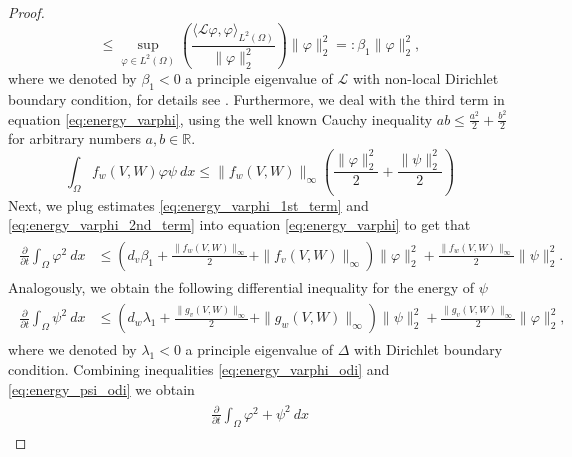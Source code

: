 \documentclass[11pt, a4paper]{article}
\theoremstyle{break}
\theoremstyle{break}
\theoremstyle{break}
\theoremstyle{break}
\theoremstyle{break}
\theoremstyle{break}
\theoremstyle{break}
\begin{document}
\begin{proof}
\begin{equation}
        \leq
        \sup_{\varphi \in L^2(\Omega)}\left( \frac{\langle \mathcal{L}\varphi, \varphi \rangle_{L^2(\Omega)}}{\|\varphi\|^2_2} \right) \|\varphi\|_2^2 =: \beta_1 \|\varphi\|_2^2,
    \end{equation}
    where we denoted by $\beta_1 < 0$ a principle eigenvalue of $\mathcal{L}$ with non-local Dirichlet boundary condition, for details see \cite{GarciaMelianRossi2009}. Furthermore, we deal with the third term in equation \eqref{eq:energy_varphi}, using the well known Cauchy inequality $ab \leq \frac{a^2}{2} + \frac{b^2}{2}$ for arbitrary numbers $a, b \in \mathbb{R}$.
    \begin{equation}
        \label{eq:energy_varphi_2nd_term}
        \int_\Omega f_w(V,W) \varphi \psi \:dx \leq \|f_w(V,W)\|_\infty \left( \frac{\|\varphi\|_2^2}{2} + \frac{\|\psi\|_2^2}{2} \right)
    \end{equation}
    Next, we plug estimates \eqref{eq:energy_varphi_1st_term} and \eqref{eq:energy_varphi_2nd_term} into equation \eqref{eq:energy_varphi} to get that
    \begin{align}
        \label{eq:energy_varphi_odi}
        \begin{split}
            \frac{\partial}{\partial t} \int_\Omega \varphi^2\:dx
            &\leq
            \left(d_v \beta_1 + \frac{\|f_w(V,W)\|_\infty}{2} + \| f_v(V, W) \|_\infty\right) \|\varphi\|_2^2  + 
            \frac{\|f_w(V,W)\|_\infty}{2}\|\psi\|_2^2.
        \end{split}
    \end{align}
    Analogously, we obtain the following differential inequality for the energy of $\psi$ 
    \begin{align}
        \label{eq:energy_psi_odi}
        \begin{split}
            \frac{\partial}{\partial t} \int_\Omega \psi^2\:dx
            &\leq
            \left(d_w \lambda_1 + \frac{\|g_v(V,W)\|_\infty}{2} + \|g_w(V, W)\|_\infty \right) \|\psi\|_2^2  + \frac{\|g_v(V,W)\|_\infty}{2} \|\varphi\|_2^2,
        \end{split}
    \end{align}
    where we denoted by $\lambda_1 < 0$ a principle eigenvalue of $\Delta$ with Dirichlet boundary condition. Combining inequalities \eqref{eq:energy_varphi_odi} and \eqref{eq:energy_psi_odi} we obtain
    \begin{align}
        \label{eq:energy_combined}
        \begin{split}
            \frac{\partial}{\partial t} \int_\Omega \varphi^2 + \psi^2\:dx

\end{split}
\end{align}
\end{proof}
\end{document}
